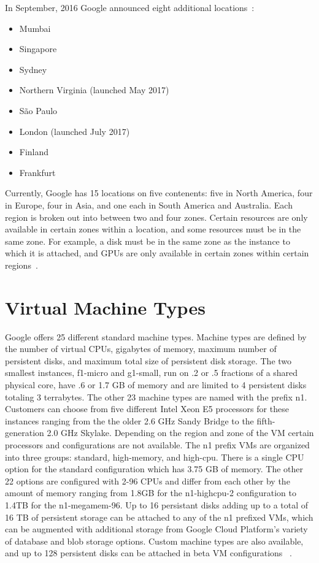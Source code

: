 In September, 2016 Google announced eight additional
locations~\cite{hid-sp18-419-gcp-history-medium}:
\begin{itemize}
  \item Mumbai
  \item Singapore
  \item Sydney
  \item Northern Virginia (launched May 2017)
  \item São Paulo
  \item London (launched July 2017)
  \item Finland
  \item Frankfurt
\end{itemize}

Currently, Google has 15 locations on five contenents: five in North
America, four in Europe, four in Asia, and one each in South America
and Australia. Each region is broken out into between two and four
zones. Certain resources are only available in certain zones within a
location, and some resources must be in the same zone. For example, a
disk must be in the same zone as the instance to which it is attached,
and GPUs are only available in certain zones within certain
regions~\cite{hid-sp18-419-gce-regions-zones}.


\section{Virtual Machine Types}

Google offers 25 different standard machine types. Machine types are
defined by the number of virtual CPUs, gigabytes of memory, maximum
number of persistent disks, and maximum total size of persistent disk
storage. The two smallest instances, f1-micro and g1-small, run on .2
or .5 fractions of a shared physical core, have .6 or 1.7 GB of memory
and are limited to 4 persistent disks totaling 3 terrabytes. The other
23 machine types are named with the prefix n1. Customers can choose
from five different Intel Xeon E5 processors for these instances
ranging from the the older 2.6 GHz Sandy Bridge to the
fifth-generation 2.0 GHz Skylake. Depending on the region and zone of
the VM certain processors and configurations are not available. The n1
prefix VMs are organized into three groups: standard, high-memory, and
high-cpu. There is a single CPU option for the standard configuration
which has 3.75 GB of memory. The other 22 options are configured with
2-96 CPUs and differ from each other by the amount of memory ranging
from 1.8GB for the n1-highcpu-2 configuration to 1.4TB for the
n1-megamem-96. Up to 16 persistant disks adding up to a total of 16 TB
of persistent storage can be attached to any of the n1 prefixed VMs,
which can be augmented with additional storage from Google Cloud
Platform's variety of database and blob storage options. Custom
machine types are also available, and up to 128 persistent disks can
be attached in beta VM configurations
~\cite{hid-sp18-419-gce-machine-types}.

